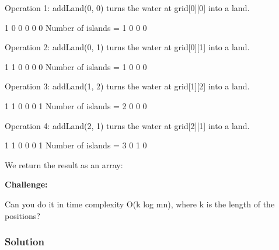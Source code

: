 Operation 1: addLand(0, 0) turns the water at grid[0][0] into a land.

\begin{Code}
1 0 0
0 0 0   Number of islands = 1
0 0 0
\end{Code}

Operation 2: addLand(0, 1) turns the water at grid[0][1] into a land.

\begin{Code}
1 1 0
0 0 0   Number of islands = 1
0 0 0
\end{Code}

Operation 3: addLand(1, 2) turns the water at grid[1][2] into a land.

\begin{Code}
1 1 0
0 0 1   Number of islands = 2
0 0 0
\end{Code}

Operation 4: addLand(2, 1) turns the water at grid[2][1] into a land.

\begin{Code}
1 1 0
0 0 1   Number of islands = 3
0 1 0
\end{Code}

We return the result as an array: \code{[1, 1, 2, 3]}

\textbf{Challenge:}

Can you do it in time complexity O(k log mn), where k is the length of the positions?

\newpage

\subsubsection{Solution}

